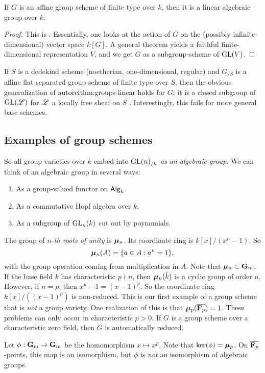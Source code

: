 \begin{theorem}\label{thm:groups-linear}
If $G$ is an affine group scheme of finite type over $k$, then it is a 
linear algebraic group over $k$. 
\end{theorem}
\begin{proof}
This is \cite[VI\textsubscript{B} 11.11]{sga3-i}. Essentially, one looks at the 
action of $G$ 
on the (possibly infinite-dimensional) vector space $k[G]$. A general theorem 
yields a faithful finite-dimensional representation $V$, and we get $G$ as a 
subgroup-scheme of $\operatorname{GL}(V)$. 
\end{proof}

\begin{hard}
If $S$ is a dedekind scheme (noetherian, one-dimensional, regular) and $G_{/S}$ 
is a affine flat separated group scheme of finite type over $S$, then the 
obvious generalization of autoref{thm:groups-linear} holds for $G$; it is a 
closed subgroup of $\operatorname{GL}(\mathscr{L})$ for $\mathscr{L}$ a locally free sheaf on $S$ 
\cite[VI\textsubscript{B} 13.5]{sga3-i}. 
Interestingly, this fails for more general base schemes. 
\end{hard}





\subsection{Examples of group schemes}

So all group varieties over $k$ embed into $\operatorname{GL}(n)_{/k}$ \emph{as an algebraic 
group}. We can think of an algebraic group in several ways: 
\begin{enumerate}
  \item As a group-valued functor on $\mathsf{Alg}_{k}$. 
  \item As a commutative Hopf algebra over $k$. 
  \item As a subgroup of $\operatorname{GL}_n(k)$ cut out by poynomials. 
\end{enumerate}

\begin{example}
The group of \emph{$n$-th roots of unity} is $\bm{\mu}_n$. Its coordinate ring is 
$k[x]/(x^n-1)$. So 
\[
  \bm{\mu}_n(A) = \{a\in A:a^n=1\} ,
\]
with the group operation coming from multiplication in $A$. Note that 
$\bm{\mu}_n\subset \mathbf{G}_\mathrm{m}$. If the base field $k$ has characteristic 
$p\nmid n$, then $\bm{\mu}_n(\bar k)$ is a cyclic group of order $n$. However, if 
$n=p$, then $x^p-1=(x-1)^p$. So the coordinate ring 
$k[x]/((x-1)^p)$ is non-reduced. This is our first example of a group scheme 
that is \emph{not} a group variety. One realization of this is that 
$\bm{\mu}_p(\overline{\mathbf{F}_p})=1$. These problems can only occur in characteristic 
$p>0$. If $G$ is a group scheme over a characteristic zero field, then 
$G$ is automatically reduced. 

Let $\phi:\mathbf{G}_\mathrm{m}\to \mathbf{G}_\mathrm{m}$ be the homomorphism $x\mapsto x^p$. Note that 
$\ker(\phi)=\bm{\mu}_p$. On $\overline{\mathbf{F}_p}$-points, this map is an isomorphism, 
but $\phi$ is \emph{not} an isomorphism of algebraic groups. 
\end{example}

